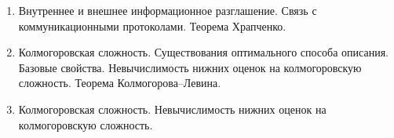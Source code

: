\begin{enumerate}
    \item Внутреннее и внешнее информационное разглашение. Связь с коммуникационными протоколами.
        Теорема Храпченко.
    \item Колмогоровская сложность. Существования оптимального способа описания. Базовые
        свойства. Невычислимость нижних оценок на колмогоровскую сложность. Теорема Колмогорова--Левина.
    \item Колмогоровская сложность. Невычислимость нижних оценок на колмогоровскую
        сложность.%
\end{enumerate}





